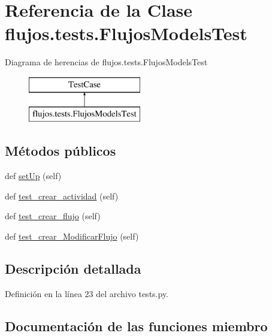 \hypertarget{classflujos_1_1tests_1_1_flujos_models_test}{}\section{Referencia de la Clase flujos.\+tests.\+Flujos\+Models\+Test}
\label{classflujos_1_1tests_1_1_flujos_models_test}
Diagrama de herencias de flujos.\+tests.\+Flujos\+Models\+Test\begin{figure}[H]
\begin{center}
\leavevmode
\includegraphics[height=2.000000cm]{classflujos_1_1tests_1_1_flujos_models_test}
\end{center}
\end{figure}
\subsection*{Métodos públicos}
\begin{DoxyCompactItemize}
\item 
def \hyperlink{classflujos_1_1tests_1_1_flujos_models_test_a3ba399ff638489b8781b0b7ec648250c}{set\+Up} (self)
\item 
def \hyperlink{classflujos_1_1tests_1_1_flujos_models_test_ab16d06b02bb69ba0c64da8a66eddaa41}{test\+\_\+crear\+\_\+actividad} (self)
\item 
def \hyperlink{classflujos_1_1tests_1_1_flujos_models_test_a521d921cf2c28e6369b2c80cf55cb670}{test\+\_\+crear\+\_\+flujo} (self)
\item 
def \hyperlink{classflujos_1_1tests_1_1_flujos_models_test_a3267197e1412cc6aac86cbb97dd9984c}{test\+\_\+crear\+\_\+\+Modificar\+Flujo} (self)
\end{DoxyCompactItemize}


\subsection{Descripción detallada}


Definición en la línea 23 del archivo tests.\+py.



\subsection{Documentación de las funciones miembro}
